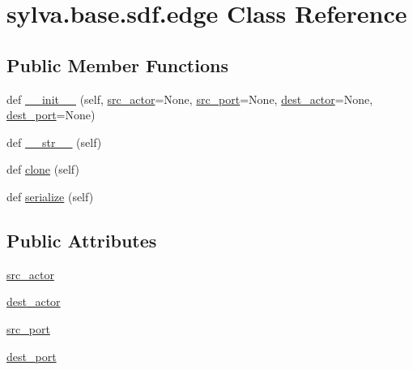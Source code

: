 \hypertarget{classsylva_1_1base_1_1sdf_1_1edge}{}\section{sylva.\+base.\+sdf.\+edge Class Reference}
\label{classsylva_1_1base_1_1sdf_1_1edge}
\subsection*{Public Member Functions}
\begin{DoxyCompactItemize}
\item 
def \hyperlink{classsylva_1_1base_1_1sdf_1_1edge_a6a95fa703d840fda3211f4b254958611}{\+\_\+\+\_\+init\+\_\+\+\_\+} (self, \hyperlink{classsylva_1_1base_1_1sdf_1_1edge_adab5e4935ad5cdd09b2c8859ea183513}{src\+\_\+actor}=None, \hyperlink{classsylva_1_1base_1_1sdf_1_1edge_a8df512cfa9966c1bf78dc8fb584aefce}{src\+\_\+port}=None, \hyperlink{classsylva_1_1base_1_1sdf_1_1edge_ad7b20c67c35c7961c81beae1694a7b73}{dest\+\_\+actor}=None, \hyperlink{classsylva_1_1base_1_1sdf_1_1edge_a29deafaf7b33e20437193990c8cef360}{dest\+\_\+port}=None)
\item 
def \hyperlink{classsylva_1_1base_1_1sdf_1_1edge_aec8cfee02481374bcbd68fb91d0afb1a}{\+\_\+\+\_\+str\+\_\+\+\_\+} (self)
\item 
def \hyperlink{classsylva_1_1base_1_1sdf_1_1edge_a1b17c24443ba7f3dc4b81c4a73ebe699}{clone} (self)
\item 
def \hyperlink{classsylva_1_1base_1_1sdf_1_1edge_a10a8a20cd0052b046c627e7e22af114d}{serialize} (self)
\end{DoxyCompactItemize}
\subsection*{Public Attributes}
\begin{DoxyCompactItemize}
\item 
\hyperlink{classsylva_1_1base_1_1sdf_1_1edge_adab5e4935ad5cdd09b2c8859ea183513}{src\+\_\+actor}
\item 
\hyperlink{classsylva_1_1base_1_1sdf_1_1edge_ad7b20c67c35c7961c81beae1694a7b73}{dest\+\_\+actor}
\item 
\hyperlink{classsylva_1_1base_1_1sdf_1_1edge_a8df512cfa9966c1bf78dc8fb584aefce}{src\+\_\+port}
\item 
\hyperlink{classsylva_1_1base_1_1sdf_1_1edge_a29deafaf7b33e20437193990c8cef360}{dest\+\_\+port}
\end{DoxyCompactItemize}
